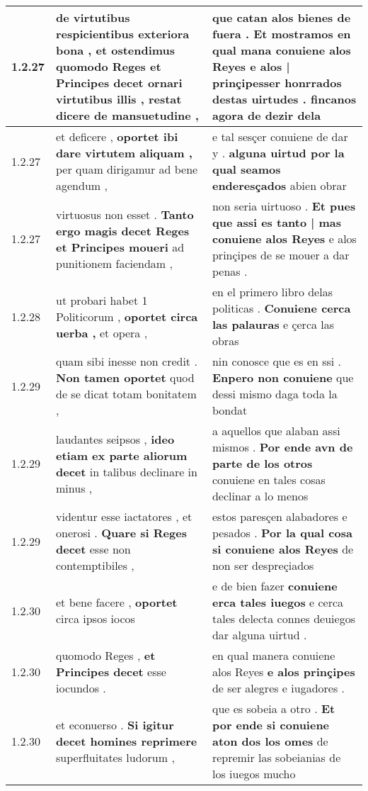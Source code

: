 \begin{tabular}{|p{1cm}|p{6.5cm}|p{6.5cm}|}
1.2.27 & de virtutibus respicientibus exteriora bona , \textbf{ et ostendimus quomodo Reges et Principes decet ornari virtutibus illis , } restat dicere de mansuetudine , & que catan alos bienes de fuera . \textbf{ Et mostramos en qual mana conuiene alos Reyes e alos | prinçipesser honrrados destas uirtudes . } fincanos agora de dezir dela \\\hline
1.2.27 & et deficere , \textbf{ oportet ibi dare virtutem aliquam , } per quam dirigamur ad bene agendum , & e tal sesçer conuiene de dar y . \textbf{ alguna uirtud por la qual seamos enderesçados } abien obrar \\\hline
1.2.27 & virtuosus non esset . \textbf{ Tanto ergo magis decet Reges et Principes moueri } ad punitionem faciendam , & non seria uirtuoso . \textbf{ Et pues que assi es tanto | mas conuiene alos Reyes } e alos prinçipes de se mouer a dar penas . \\\hline
1.2.28 & ut probari habet 1 Politicorum , \textbf{ oportet circa uerba , } et opera , & en el primero libro delas politicas . \textbf{ Conuiene cerca las palauras } e çerca las obras \\\hline
1.2.29 & quam sibi inesse non credit . \textbf{ Non tamen oportet } quod de se dicat totam bonitatem , & nin conosce que es en ssi . \textbf{ Enpero non conuiene } que dessi mismo daga toda la bondat \\\hline
1.2.29 & laudantes seipsos , \textbf{ ideo etiam ex parte aliorum decet } in talibus declinare in minus , & a aquellos que alaban assi mismos . \textbf{ Por ende avn de parte de los otros } conuiene en tales cosas declinar a lo menos \\\hline
1.2.29 & videntur esse iactatores , et onerosi . \textbf{ Quare si Reges decet } esse non contemptibiles , & estos paresçen alabadores e pesados . \textbf{ Por la qual cosa si conuiene alos Reyes } de non ser despreçiados \\\hline
1.2.30 & et bene facere , \textbf{ oportet } circa ipsos iocos & e de bien fazer \textbf{ conuiene erca tales iuegos } e cerca tales delecta connes deuiegos dar alguna uirtud . \\\hline
1.2.30 & quomodo Reges , \textbf{ et Principes decet } esse iocundos . & en qual manera conuiene alos Reyes \textbf{ e alos prinçipes } de ser alegres e iugadores . \\\hline
1.2.30 & et econuerso . \textbf{ Si igitur decet homines reprimere } superfluitates ludorum , & que es sobeia a otro . \textbf{ Et por ende si conuiene aton dos los omes } de repremir las sobeianias de los iuegos mucho \\\hline

\end{tabular}
